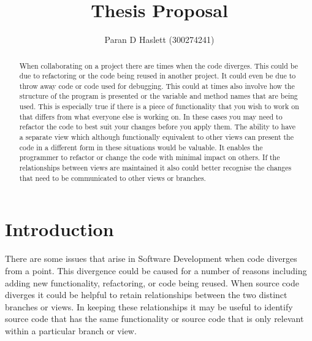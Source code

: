 \documentclass[12pt]{CRPITStyle}
\begin{document}
\title{Thesis Proposal}
\author{Paran D Haslett (300274241)}
\maketitle

\begin{abstract}
When collaborating on a project there are times when the code diverges. This could be due to refactoring or the code being reused in another project. It could even be due to throw away code or code used for debugging. This could at times also involve how the structure of the program is presented or the variable and method names that are being used. This is especially true if there is a piece of functionality that you wish to work on that differs from what everyone else is working on. In these cases you may need to refactor the code to best suit your changes before you apply them. The ability to have a separate view which although functionally equivalent to other views can present the code in a different form in these situations would be valuable. It enables the programmer to refactor or change the code with minimal impact on others. If the relationships between views are maintained it also could better recognise the changes that need to be communicated to other views or branches.
\end{abstract}
\vspace{.1in}


\section{Introduction}
There are some issues that arise in Software Development when code diverges from a point. This divergence could be caused for a number of reasons including adding new functionality, refactoring, or code being reused. When source code diverges it could be helpful to retain relationships between the two distinct branches or views. In keeping these relationships it may be useful to identify source code that has the same functionality or source code that is only relevant within a particular branch or view. 
\end{document}

